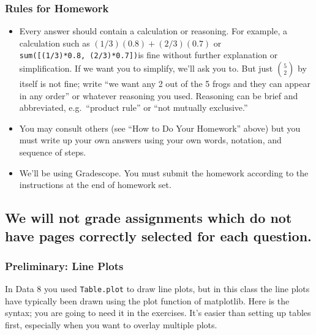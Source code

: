 \documentclass[11pt]{article}
\providecommand{\tightlist}{%
      \setlength{\itemsep}{0pt}\setlength{\parskip}{0pt}}
\begin{document}
    \hypertarget{rules-for-homework}{%
\subsubsection{Rules for Homework}\label{rules-for-homework}}

\begin{itemize}
\tightlist
\item
  Every answer should contain a calculation or reasoning. For example, a
  calculation such as \((1/3)(0.8) + (2/3)(0.7)\) or
  \texttt{sum({[}(1/3)*0.8,\ (2/3)*0.7{]})}is fine without further
  explanation or simplification. If we want you to simplify, we'll ask
  you to. But just \({5 \choose 2}\) by itself is not fine; write ``we
  want any 2 out of the 5 frogs and they can appear in any order'' or
  whatever reasoning you used. Reasoning can be brief and abbreviated,
  e.g.~``product rule'' or ``not mutually exclusive.''
\item
  You may consult others (see ``How to Do Your Homework'' above) but you
  must write up your own answers using your own words, notation, and
  sequence of steps.
\item
  We'll be using Gradescope. You must submit the homework according to
  the instructions at the end of homework set.
\end{itemize}

\hypertarget{we-will-not-grade-assignments-which-do-not-have-pages-correctly-selected-for-each-question.}{%
\subsection{\texorpdfstring{\textbf{We will not grade assignments which
do not have pages correctly selected for each
question.}}{We will not grade assignments which do not have pages correctly selected for each question.}}\label{we-will-not-grade-assignments-which-do-not-have-pages-correctly-selected-for-each-question.}}

    \hypertarget{preliminary-line-plots}{%
\subsubsection{Preliminary: Line Plots}\label{preliminary-line-plots}}

In Data 8 you used \texttt{Table.plot} to draw line plots, but in this
class the line plots have typically been drawn using the plot function
of matplotlib. Here is the syntax; you are going to need it in the
exercises. It's easier than setting up tables first, especially when you
want to overlay multiple plots.
\end{document}
